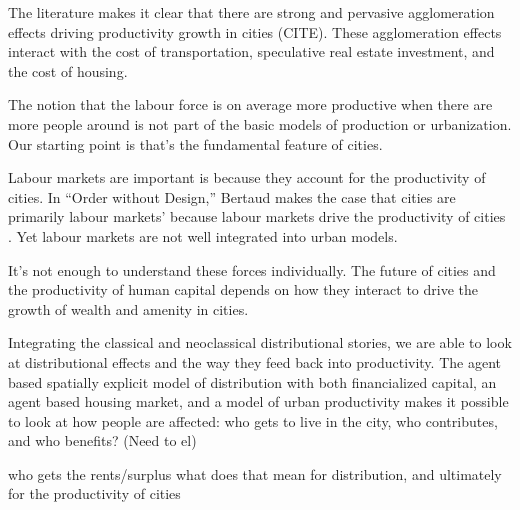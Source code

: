 The literature makes it clear that there are strong and  pervasive agglomeration effects driving productivity growth in cities (CITE). %
These agglomeration effects interact with the cost of transportation, speculative real estate investment, and the cost of housing. 

The notion that the labour force is on average more productive when there are more people around is %
not part of the basic models of production or urbanization. Our starting point is that's the fundamental feature of cities. 

Labour markets are important is because they account for the productivity of cities.
In ``Order without Design,'' Bertaud makes the case that cities are primarily labour markets' because labour markets drive the productivity of cities \cite{bertaudOrderDesignHow2018}. Yet labour markets are not well integrated into urban models. 

It's not enough to understand these forces individually. The future of cities and the productivity of human capital depends on how they interact to drive the growth of wealth and amenity in cities. 

Integrating the classical and neoclassical  distributional stories, we are able to look at distributional effects and the way they feed back into productivity. The agent based spatially explicit model of distribution with both financialized capital, an agent based housing market, and a model of urban productivity makes it possible to look at how people are affected: who gets to live in the city, who contributes, and who benefits? (Need to el)

who gets the rents/surplus what does that mean for distribution, and ultimately for the productivity of cities





